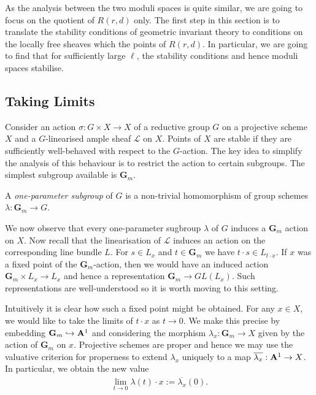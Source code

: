 \documentclass[12pt]{ociamthesis}  %
\begin{document}
As the analysis between the two moduli spaces is quite similar,
we are going to focus on the quotient of $R(r,d)$ only.
The first step in this section is to translate the stability
conditions of geometric invariant theory to conditions on the locally
free sheaves which the points of $R(r,d)$.  In particular, we
are going to find that for sufficiently large $\ell$,
the stability conditions and hence moduli spaces stabilise.

\subsection{Taking Limits}

Consider an action $\sigma : G \times X\to X$ of a reductive group $G$
on a projective scheme $X$ and a $G$-linearised ample sheaf
$\mathscr L$ on $X$. Points of $X$ are stable if they are sufficiently
well-behaved with respect to the $G$-action. The key idea to simplify
the analysis of this behaviour is to restrict the action to certain
subgroups. The simplest subgroup available is $\mathbf G_m$.

\begin{definition}
  A \emph{one-parameter subgroup} of $G$ is a non-trivial homomorphism
  of group schemes $\lambda : \mathbf G_m \to G$.
\end{definition}

We now observe that every one-parameter sugbroup $\lambda$ of $G$
induces a $\mathbf G_m$ action on $X$. Now recall that the
linearisation of $\mathscr L$ induces an action on the corresponding
line bundle $L$. For $s\in L_x$ and $t\in \mathbf G_m$ we have
$t\cdot s\in L_{t\cdot x}$. If $x$ was a fixed point of the
$\mathbf G_m$-action, then we would have an induced action
$\mathbf G_m\times L_x \to L_x$ and hence a representation
$\mathbf G_m\to GL(L_x)$. Such representations are well-understood
so it is worth moving to this setting.

Intuitively it is clear how such a fixed point might be obtained.
For any $x\in X$, we would like to take the limits of $t\cdot x$
as $t\to 0$. We make this precise
by embedding $\mathbf G_m\hookrightarrow\mathbf A^1$ and
considering the morphism $\lambda_x : \mathbf G_m \to X$ given by
the action of $\mathbf G_m$ on $x$.
Projective schemes are proper and hence we may use the valuative
criterion for properness to extend $\lambda_x$ uniquely to a map
$\overline{\lambda_x} : \mathbf{A}^{1}_{} \to X$.
In particular, we obtain the new value
\begin{align*}
  \lim_{t\to 0}\lambda(t)\cdot x := \overline{\lambda_x}(0).
\end{align*}
\end{document}
